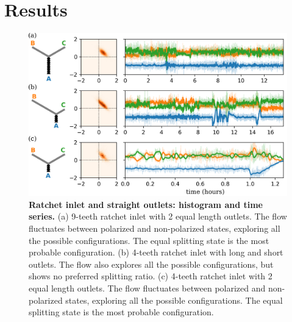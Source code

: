 \documentclass[%
10pt,
superscriptaddress,
twocolumn,
 amsmath,amssymb,
 aps,prx,
]{revtex4-2}
\begin{document}
\section{Results}

\begin{figure}[!h]
    \includegraphics[width=\textwidth]{4-straight-channel-length}
    \caption{
    \textbf{Ratchet inlet and straight outlets: histogram and time series.}
    (a) 9-teeth ratchet inlet with 2 equal length outlets. 
    The flow fluctuates between polarized and non-polarized states, exploring all the possible configurations.
    The equal splitting state is the most probable configuration.
    (b) 4-teeth ratchet inlet with long and short outlets.
    The flow also explores all the possible configurations, but shows no preferred splitting ratio.
    (c) 4-teeth ratchet inlet with 2 equal length outlets.
    The flow fluctuates between polarized and non-polarized states, exploring all the possible configurations.
    The equal splitting state is the most probable configuration.
    }
    \label{fig:straight-channel-length}
\end{figure}
\end{document}
